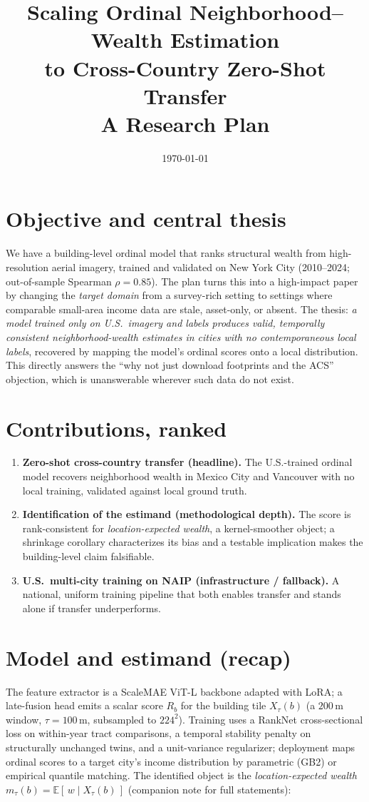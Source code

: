 \documentclass[11pt]{article}
\title{\vspace{-3em}Scaling Ordinal Neighborhood--Wealth Estimation\\
to Cross-Country Zero-Shot Transfer\\[0.3em]
\large A Research Plan}
\author{}
\date{\today}
\theoremstyle{plain}
\theoremstyle{remark}
\newcommand{\E}{\mathbb{E}}
\newcommand{\Xt}{X_\tau}
\begin{document}
\maketitle
\vspace{-2.5em}

\section{Objective and central thesis}
We have a building-level ordinal model that ranks structural wealth from
high-resolution aerial imagery, trained and validated on New York City
(2010--2024; out-of-sample Spearman $\rho=0.85$). The plan turns this into a
high-impact paper by changing the \emph{target domain} from a survey-rich setting
to settings where comparable small-area income data are stale, asset-only, or
absent. The thesis: \emph{a model trained only on U.S.\ imagery and labels
produces valid, temporally consistent neighborhood-wealth estimates in cities
with no contemporaneous local labels}, recovered by mapping the model's ordinal
scores onto a local distribution. This directly answers the ``why not just
download footprints and the ACS'' objection, which is unanswerable wherever such
data do not exist.

\section{Contributions, ranked}
\begin{enumerate}[leftmargin=1.4em,itemsep=0.15em]
\item \textbf{Zero-shot cross-country transfer (headline).} The U.S.-trained
ordinal model recovers neighborhood wealth in Mexico City and Vancouver with no
local training, validated against local ground truth.
\item \textbf{Identification of the estimand (methodological depth).} The score is
rank-consistent for \emph{location-expected wealth}, a kernel-smoother object; a
shrinkage corollary characterizes its bias and a testable implication makes the
building-level claim falsifiable.
\item \textbf{U.S.\ multi-city training on NAIP (infrastructure / fallback).} A
national, uniform training pipeline that both enables transfer and stands alone if
transfer underperforms.
\end{enumerate}

\section{Model and estimand (recap)}
The feature extractor is a ScaleMAE ViT-L backbone adapted with LoRA; a late-fusion
head emits a scalar score $R_b$ for the building tile $\Xt(b)$ (a $200\,$m window,
$\tau=100\,$m, subsampled to $224^2$). Training uses a RankNet cross-sectional loss
on within-year tract comparisons, a temporal stability penalty on structurally
unchanged twins, and a unit-variance regularizer; deployment maps ordinal scores to
a target city's income distribution by parametric (GB2) or empirical quantile
matching. The identified object is the \emph{location-expected wealth}
$m_\tau(b)=\E[\,w\mid \Xt(b)\,]$ (companion note for full statements):
\end{document}
